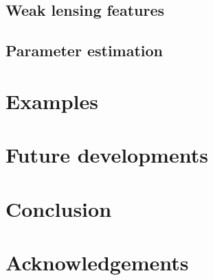 \documentclass[reprint,aps,prd,superscriptaddress,showkeys,showpacs]{revtex4-1}
\begin{document}
\subsection{Weak lensing features}

\subsection{Parameter estimation}


\section{Examples}


\section{Future developments}


\section{Conclusion}

 

\section*{Acknowledgements}



\label{lastpage}
\end{document}
